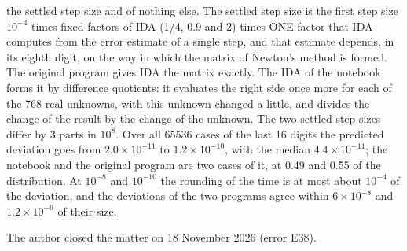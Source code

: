 \documentclass[
  10pt,
]{article}
\begin{document}
\begin{enumerate}
  the settled step size and of nothing else. The settled step size is
  the first step size \(10^{-4}\) times fixed factors of IDA (1/4, 0.9
  and 2) times ONE factor that IDA computes from the error estimate of a
  single step, and that estimate depends, in its eighth digit, on the
  way in which the matrix of Newton's method is formed. The original
  program gives IDA the matrix exactly. The IDA of the notebook forms it
  by difference quotients: it evaluates the right side once more for
  each of the 768 real unknowns, with this unknown changed a little, and
  divides the change of the result by the change of the unknown. The two
  settled step sizes differ by 3 parts in \(10^{8}\). Over all 65536
  cases of the last 16 digits the predicted deviation goes from
  \(2.0\times10^{-11}\) to \(1.2\times10^{-10}\), with the median
  \(4.4\times10^{-11}\); the notebook and the original program are two
  cases of it, at 0.49 and 0.55 of the distribution. At \(10^{-8}\) and
  \(10^{-10}\) the rounding of the time is at most about \(10^{-4}\) of
  the deviation, and the deviations of the two programs agree within
  \(6\times10^{-8}\) and \(1.2\times10^{-6}\) of their size.
\end{enumerate}

The author closed the matter on 18 November 2026 (error E38).
\end{document}

